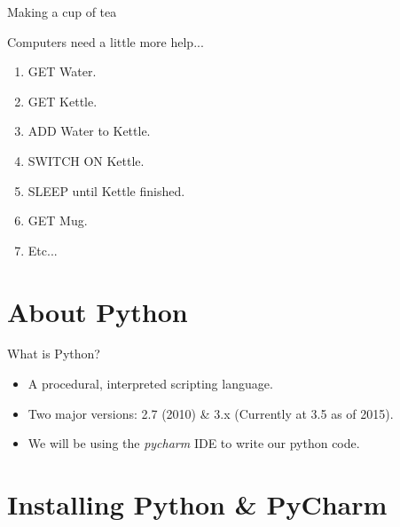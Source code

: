 \documentclass{beamer}
\begin{document}
\begin{frame}{Making a cup of tea}

Computers need a little more help...
\pause
\begin{enumerate}

  \item {
    GET Water.
    \pause %
  }
  \item {
    GET Kettle.
    \pause %
  }
  \item {   
    ADD Water to Kettle.
    \pause
  }
  \item {
    SWITCH ON Kettle.
    \pause
  }
  \item {
    SLEEP until Kettle finished.
    \pause
  }
  
  \item {
    GET Mug.
    \pause
  }

  \item {
    Etc...
  }

  \end{enumerate}

\end{frame}


\section{About Python}

\begin{frame}{What is Python?}

\begin{itemize}

  \item {
    A procedural, interpreted scripting language.
    \pause %
  }
  \item {
    Two major versions: 2.7 (2010) \& 3.x (Currently at 3.5 as of 2015).
    \pause %
  }
  \item {   
    We will be using the \textit{pycharm} IDE to write our python code. 
  }

  \end{itemize}

\end{frame}

\section{Installing Python \& PyCharm}
\end{document}
